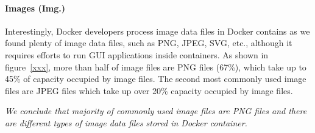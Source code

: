 \paragraph{Images (Img.)}

Interestingly, Docker developers process image data files in Docker contains as we found plenty of image data files, such as PNG, JPEG, SVG, etc., although it requires efforts to run GUI applications inside containers.
As shown in figure~\ref{xxx}, more than half of image files are PNG files (67\%), which take up to 45\% of capacity occupied by image files. The second most commonly used image files are JPEG files which take up over 20\% capacity occupied by image files.

\textit{We conclude that majority of commonly used image files are PNG files and there are different types of image data files stored in Docker container.}

%




